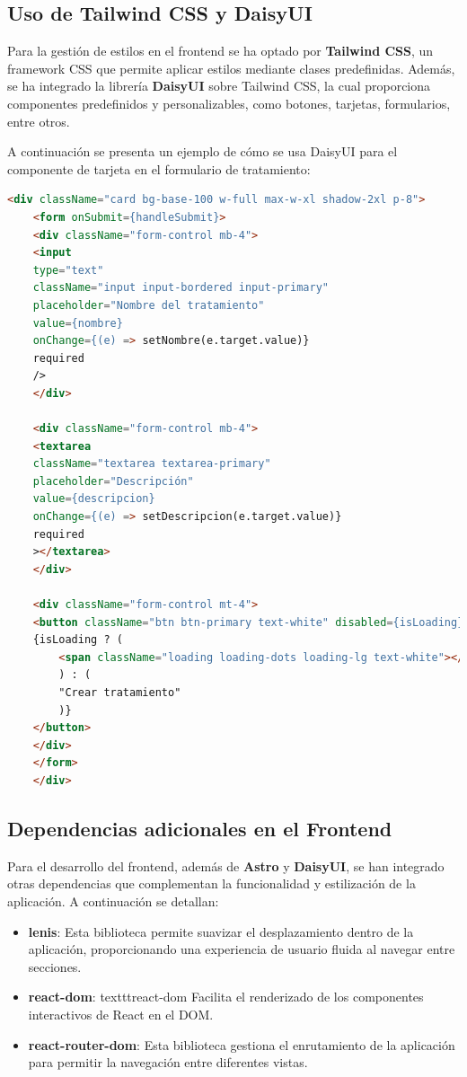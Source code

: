\newpage
\subsection{Uso de Tailwind CSS y DaisyUI}

Para la gestión de estilos en el frontend se ha optado por \textbf{Tailwind CSS}, un framework CSS que permite aplicar estilos mediante clases predefinidas. Además, se ha integrado la librería \textbf{DaisyUI} sobre Tailwind CSS, la cual proporciona componentes predefinidos y personalizables, como botones, tarjetas, formularios, entre otros. 

A continuación se presenta un ejemplo de cómo se usa DaisyUI para el componente de tarjeta en el formulario de tratamiento:

\begin{lstlisting}[language=html, caption={Ejemplo de componente de tarjeta con DaisyUI}]
	<div className="card bg-base-100 w-full max-w-xl shadow-2xl p-8">
	<form onSubmit={handleSubmit}>
	<div className="form-control mb-4">
	<input
	type="text"
	className="input input-bordered input-primary"
	placeholder="Nombre del tratamiento"
	value={nombre}
	onChange={(e) => setNombre(e.target.value)}
	required
	/>
	</div>
	
	<div className="form-control mb-4">
	<textarea
	className="textarea textarea-primary"
	placeholder="Descripción"
	value={descripcion}
	onChange={(e) => setDescripcion(e.target.value)}
	required
	></textarea>
	</div>
	
	<div className="form-control mt-4">
	<button className="btn btn-primary text-white" disabled={isLoading}>
	{isLoading ? (
		<span className="loading loading-dots loading-lg text-white"></span>
		) : (
		"Crear tratamiento"
		)}
	</button>
	</div>
	</form>
	</div>
\end{lstlisting}

\subsection{Dependencias adicionales en el Frontend}

Para el desarrollo del frontend, además de \textbf{Astro} y \textbf{DaisyUI}, se han integrado otras dependencias que complementan la funcionalidad y estilización de la aplicación. A continuación se detallan:

\begin{itemize}
	\item \textbf{lenis}: Esta biblioteca permite suavizar el desplazamiento dentro de la aplicación, proporcionando una experiencia de usuario fluida al navegar entre secciones.
	
	\item \textbf{react-dom}: texttt{react-dom} Facilita el renderizado de los componentes interactivos de React en el DOM.
	
	\item \textbf{react-router-dom}: Esta biblioteca gestiona el enrutamiento de la aplicación para permitir la navegación entre diferentes vistas.
	
\end{itemize}

